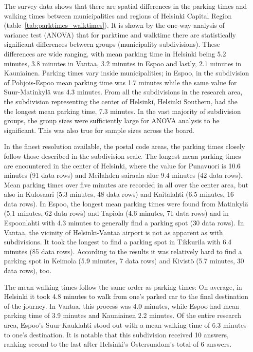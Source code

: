 The survey data shows that there are spatial differences in the parking times and walking times between municipalities and regions of Helsinki Capital Region (table~\ref{tab:parktimes_walktimes}). It is shown by the one-way analysis of variance test (ANOVA) that for parktime and walktime there are statistically significant differences between groups (municipality subdivisions). These differences are wide ranging, with mean parking time in Helsinki being 5.2 minutes, 3.8 minutes in Vantaa, 3.2 minutes in Espoo and lastly, 2.1 minutes in Kauniainen. Parking times vary inside municipalities; in Espoo, in the subdivision of Pohjois-Espoo mean parking time was 1.7 minutes while the same value for Suur-Matinkylä was 4.3 minutes. From all the subdivisions in the research area, the subdivision representing the center of Helsinki, Helsinki Southern, had the the longest mean parking time, 7.3 minutes. In the vast majority of subdivision groups, the group sizes were sufficiently large for ANOVA analysis to be significant. This was also true for sample sizes across the board.

In the finest resolution available, the postal code areas, the parking times closely follow those described in the subdivision scale. The longest mean parking times are encountered in the center of Helsinki, where the value for Punavuori is 10.6 minutes (91 data rows) and Meilahden sairaala-alue 9.4 minutes (42 data rows). Mean parking times over five minutes are recorded in all over the center area, but also in Kulosaari (5.3 minutes, 48 data rows) and Kaitalahti (6.5 minutes, 16 data rows). In Espoo, the longest mean parking times were found from Matinkylä (5.1 minutes, 62 data rows) and Tapiola (4.6 minutes, 71 data rows) and in Espoonlahti with 4.3 minutes to generally find a parking spot (30 data rows). In Vantaa, the vicinity of Helsinki-Vantaa airport is not as apparent as with subdivisions. It took the longest to find a parking spot in Tikkurila with 6.4 minutes (85 data rows). According to the results it was relatively hard to find a parking spot in Keimola (5.9 minutes, 7 data rows) and Kivistö (5.7 minutes, 30 data rows), too.

The mean walking times follow the same order as parking times: On average, in Helsinki it took 4.8 minutes to walk from one's parked car to the final destination of the journey. In Vantaa, this process was 4.0 minutes, while Espoo had mean parking time of 3.9 minutes and Kauniainen 2.2 minutes. Of the entire research area, Espoo's Suur-Kauklahti stood out with a mean walking time of 6.3 minutes to one's destination. It is notable that this subdivision received 10 answers, ranking second to the last after Helsinki's Östersundom's total of 6 answers.

